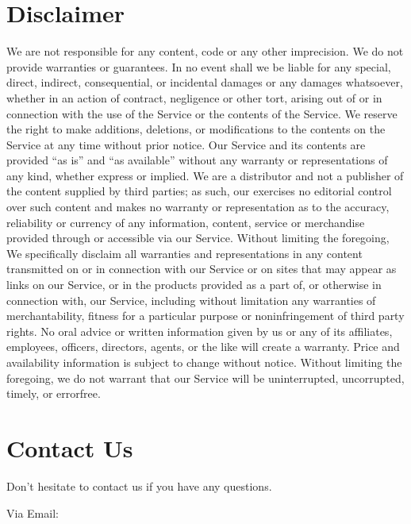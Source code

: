 \documentclass[letterpaper,11pt,openany,oneside,english,openany]{sphinxmanual}
\begin{document}
\section{\sphinxhyphen{}Disclaimer}
\label{\detokenize{terms_and_conditions:disclaimer}}
\sphinxAtStartPar
We are not responsible for any content, code or any other imprecision. We do not provide warranties or guarantees. In no
event shall we be liable for any special, direct, indirect, consequential, or incidental damages or any damages whatsoever,
whether in an action of contract, negligence or other tort, arising out of or in connection with the use of the Service or the
contents of the Service. We reserve the right to make additions, deletions, or modifications to the contents on the Service at
any time without prior notice.
Our Service and its contents are provided “as is” and “as available” without any warranty or representations of any kind,
whether express or implied. We are a distributor and not a publisher of the content supplied by third parties; as such, our
exercises no editorial control over such content and makes no warranty or representation as to the accuracy, reliability or
currency of any information, content, service or merchandise provided through or accessible via our Service. Without limiting
the foregoing, We specifically disclaim all warranties and representations in any content transmitted on or in connection with
our Service or on sites that may appear as links on our Service, or in the products provided as a part of, or otherwise in
connection with, our Service, including without limitation any warranties of merchantability, fitness for a particular purpose or
non\sphinxhyphen{}infringement of third party rights. No oral advice or written information given by us or any of its affiliates, employees,
officers, directors, agents, or the like will create a warranty. Price and availability information is subject to change without
notice. Without limiting the foregoing, we do not warrant that our Service will be uninterrupted, uncorrupted, timely, or errorfree.


\section{\sphinxhyphen{}Contact Us}
\label{\detokenize{terms_and_conditions:contact-us}}
\sphinxAtStartPar
Don’t hesitate to contact us if you have any questions.

\sphinxAtStartPar
\sphinxhyphen{}Via Email: 
\end{document}
